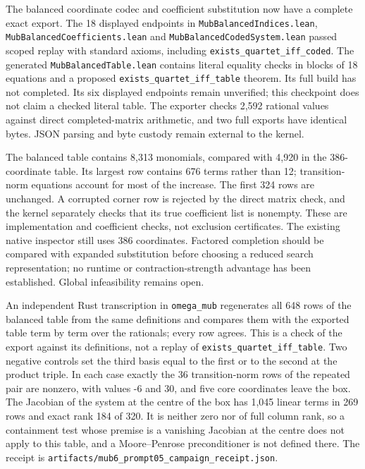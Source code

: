 \documentclass[
]{article}
\begin{document}
The balanced coordinate codec and coefficient substitution now have a
complete exact export. The 18 displayed endpoints in
\nolinkurl{MubBalancedIndices.lean},
\nolinkurl{MubBalancedCoefficients.lean} and
\nolinkurl{MubBalancedCodedSystem.lean} passed scoped replay with
standard axioms, including \nolinkurl{exists_quartet_iff_coded}. The
generated \nolinkurl{MubBalancedTable.lean} contains literal equality
checks in blocks of 18 equations and a proposed
\nolinkurl{exists_quartet_iff_table} theorem. Its full build has not
completed. Its six displayed endpoints remain unverified; this
checkpoint does not claim a checked literal table. The exporter checks
2,592 rational values against direct completed-matrix arithmetic, and
two full exports have identical bytes. JSON parsing and byte custody
remain external to the kernel.

The balanced table contains 8,313 monomials, compared with 4,920 in the
386-coordinate table. Its largest row contains 676 terms rather than 12;
transition-norm equations account for most of the increase. The first
324 rows are unchanged. A corrupted corner row is rejected by the direct
matrix check, and the kernel separately checks that its true coefficient
list is nonempty. These are implementation and coefficient checks, not
exclusion certificates. The existing native inspector still uses 386
coordinates. Factored completion should be compared with expanded
substitution before choosing a reduced search representation; no runtime
or contraction-strength advantage has been established. Global
infeasibility remains open.

An independent Rust transcription in \nolinkurl{omega_mub} regenerates
all 648 rows of the balanced table from the same definitions and
compares them with the exported table term by term over the rationals;
every row agrees. This is a check of the export against its definitions,
not a replay of \nolinkurl{exists_quartet_iff_table}. Two negative
controls set the third basis equal to the first or to the second at the
product triple. In each case exactly the 36 transition-norm rows of the
repeated pair are nonzero, with values -6 and 30, and five core
coordinates leave the box. The Jacobian of the system at the centre of
the box has 1,045 linear terms in 269 rows and exact rank 184 of 320. It
is neither zero nor of full column rank, so a containment test whose
premise is a vanishing Jacobian at the centre does not apply to this
table, and a Moore--Penrose preconditioner is not defined there. The
receipt is \nolinkurl{artifacts/mub6_prompt05_campaign_receipt.json}.
\end{document}
